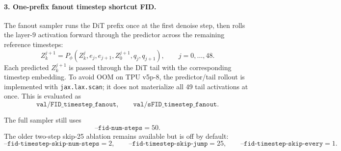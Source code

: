 \documentclass[11pt]{article}
\begin{document}
\paragraph{3. One-prefix fanout timestep shortcut FID.}
The fanout sampler runs the DiT prefix once at the first denoise step, then
rolls the layer-$9$ activation forward through the predictor across the
remaining reference timesteps:
\[
  Z_k^{j+1}=P_\phi(Z_k^j,e_j,e_{j+1},Z_0^{j+1},q_j,q_{j+1}),
  \qquad j=0,\ldots,48.
\]
Each predicted $Z_k^{j+1}$ is passed through the DiT tail with the corresponding
timestep embedding. To avoid OOM on TPU v5p-8, the predictor/tail rollout is
implemented with \texttt{jax.lax.scan}; it does not materialize all 49 tail
activations at once. This is evaluated as
\[
  \texttt{val/FID\_timestep\_fanout},\qquad
  \texttt{val/sFID\_timestep\_fanout}.
\]

The full sampler still uses
\[
  \texttt{--fid-num-steps}=50.
\]
The older two-step skip-25 ablation remains available but is off by default:
\[
  \texttt{--fid-timestep-skip-num-steps}=2,\qquad
  \texttt{--fid-timestep-skip-jump}=25,\qquad
  \texttt{--fid-timestep-skip-every}=1.
\]
\end{document}
